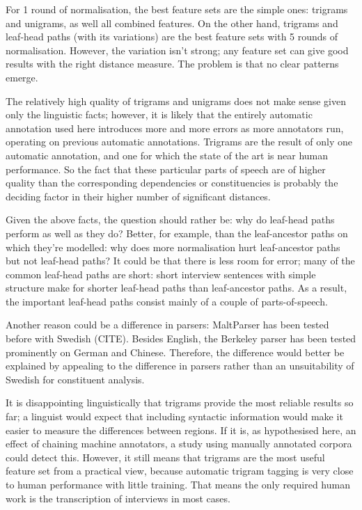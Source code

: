 For 1 round of normalisation, the best feature sets are the simple
ones: trigrams and unigrams, as well all combined features. On the
other hand, trigrams and leaf-head paths (with its variations) are the
best feature sets with 5 rounds of normalisation. However, the
variation isn't strong; any feature set can give good results with the
right distance measure. The problem is that no clear patterns emerge.

The relatively high quality of trigrams and unigrams does not make
sense given only the linguistic facts; however, it is likely that the
entirely automatic annotation used here introduces more and more
errors as more annotators run, operating on previous automatic
annotations. Trigrams are the result of only one automatic annotation,
and one for which the state of the art is near human performance. So
the fact that these particular parts of speech are of higher quality
than the corresponding dependencies or constituencies is probably the
deciding factor in their higher number of significant
distances.


Given the above facts, the question should rather be: why do leaf-head
paths perform as well as they do? Better, for example, than the
leaf-ancestor paths on which they're modelled: why does more
normalisation hurt leaf-ancestor paths but not leaf-head paths?  It
could be that there is less room for error; many of the common
leaf-head paths are short: short interview sentences with simple
structure make for shorter leaf-head paths than leaf-ancestor
paths. As a result, the important leaf-head paths consist mainly of a
couple of parts-of-speech.

Another reason could be a difference in parsers: MaltParser has been
tested before with Swedish (CITE). Besides English, the Berkeley
parser has been tested prominently on German and Chinese. Therefore,
the difference would better be explained by appealing to the
difference in parsers rather than an unsuitability of Swedish for
constituent analysis.

It is disappointing linguistically that trigrams provide the most
reliable results so far; a linguist would expect that including
syntactic information would make it easier to measure the differences
between regions. If it is, as hypothesised here, an effect of chaining
machine annotators, a study using manually annotated corpora could
detect this. However, it still means that trigrams are the most useful
feature set from a practical view, because automatic trigram tagging
is very close to human performance with little training. That means
the only required human work is the transcription of interviews in
most cases.

